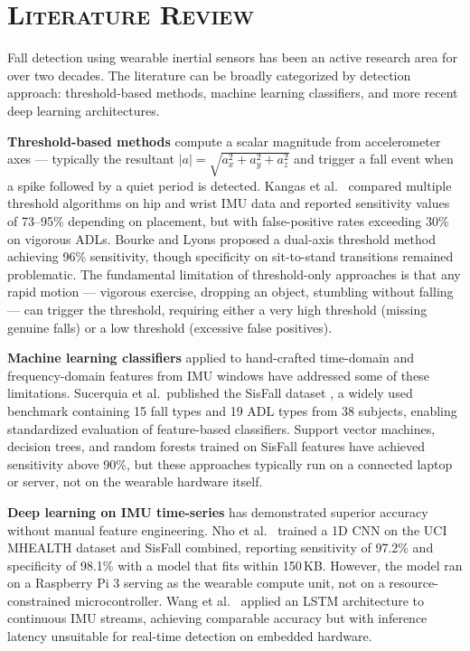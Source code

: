 
\chapter{\scshape Literature Review}

Fall detection using wearable inertial sensors has been an active research area for over two decades. The literature can be broadly categorized by detection approach: threshold-based methods, machine learning classifiers, and more recent deep learning architectures.

\textbf{Threshold-based methods} compute a scalar magnitude from accelerometer axes --- typically the resultant $|a| = \sqrt{a_x^2 + a_y^2 + a_z^2}$ and trigger a fall event when a spike followed by a quiet period is detected. Kangas et al.\ \cite{kangas2008comparison} compared multiple threshold algorithms on hip and wrist IMU data and reported sensitivity values of 73--95\% depending on placement, but with false-positive rates exceeding 30\% on vigorous ADLs. Bourke and Lyons \cite{bourke2008threshold} proposed a dual-axis threshold method achieving 96\% sensitivity, though specificity on sit-to-stand transitions remained problematic. The fundamental limitation of threshold-only approaches is that any rapid motion --- vigorous exercise, dropping an object, stumbling without falling --- can trigger the threshold, requiring either a very high threshold (missing genuine falls) or a low threshold (excessive false positives).

\textbf{Machine learning classifiers} applied to hand-crafted time-domain and frequency-domain features from IMU windows have addressed some of these limitations. Sucerquia et al.\ published the SisFall dataset \cite{sucerquia2017sisfall}, a widely used benchmark containing 15 fall types and 19 ADL types from 38 subjects, enabling standardized evaluation of feature-based classifiers. Support vector machines, decision trees, and random forests trained on SisFall features have achieved sensitivity above 90\%, but these approaches typically run on a connected laptop or server, not on the wearable hardware itself.

\textbf{Deep learning on IMU time-series} has demonstrated superior accuracy without manual feature engineering. Nho et al.\ \cite{nho2021cnn} trained a 1D CNN on the UCI MHEALTH dataset and SisFall combined, reporting sensitivity of 97.2\% and specificity of 98.1\% with a model that fits within 150\,KB. However, the model ran on a Raspberry Pi 3 serving as the wearable compute unit, not on a resource-constrained microcontroller. Wang et al.\ \cite{wang2020lstm} applied an LSTM architecture to continuous IMU streams, achieving comparable accuracy but with inference latency unsuitable for real-time detection on embedded hardware.

